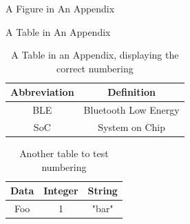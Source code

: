 \documentclass{workreport}
\begin{document}
\begin{backmatter}
\begin{appendix}{A Figure in An Appendix}
\end{appendix}

\begin{appendix}{A Table in An Appendix}

        \lipsum[1-2]

        \begin{table}
		\centering

		\begin{tabular}{|c|c|} \hline
			\textbf{Abbreviation} & \textbf{Definition} \\ \hline
			BLE & Bluetooth Low Energy \\ \hline
			SoC & System on Chip \\ \hline
		\end{tabular}

		\caption{A Table in an Appendix, displaying the correct numbering}
        \end{table}

	\begin{table}
		\centering
		\begin{tabular}{|c|c|c|} \hline
			\textbf{Data} & \textbf{Integer} & \textbf{String} \\ \hline
			Foo & 1 & "bar" \\ \hline
		\end{tabular}
		\caption{Another table to test numbering}
	\end{table}

\end{appendix}

\end{backmatter}
\end{document}
